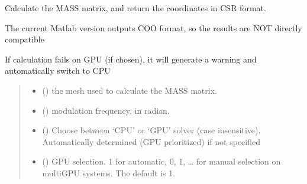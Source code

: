 \documentclass[letterpaper,10pt,english]{sphinxmanual}
\begin{document}
\begin{fulllineitems}
\label{\detokenize{_autosummary/nirfasterff.math.gen_mass_matrix:nirfasterff.math.gen_mass_matrix}}
\pysigstartsignatures
\pysiglinewithargsret
{}
{\sphinxparamcomma {}\sphinxparamcomma {}\sphinxparamcomma {}}
{}
\pysigstopsignatures
\sphinxAtStartPar
Calculate the MASS matrix, and return the coordinates in CSR format.

\sphinxAtStartPar
The current Matlab version outputs COO format, so the results are NOT directly compatible

\sphinxAtStartPar
If calculation fails on GPU (if chosen), it will generate a warning and automatically switch to CPU
\begin{quote}\begin{description}
\begin{itemize}
\item {} 
\sphinxAtStartPar
{} () \textendash{} the mesh used to calculate the MASS matrix.

\item {} 
\sphinxAtStartPar
{} () \textendash{} modulation frequency, in radian.

\item {} 
\sphinxAtStartPar
{} (\sphinxstyleliteralemphasis{\sphinxupquote{, }}) \textendash{} Choose between ‘CPU’ or ‘GPU’ solver (case insensitive). Automatically determined (GPU prioritized) if not specified

\item {} 
\sphinxAtStartPar
{} (\sphinxstyleliteralemphasis{\sphinxupquote{, }}) \textendash{} GPU selection. \sphinxhyphen{}1 for automatic, 0, 1, … for manual selection on multi\sphinxhyphen{}GPU systems. The default is \sphinxhyphen{}1.


\end{itemize}
\end{description}
\end{quote}
\end{fulllineitems}
\end{document}
